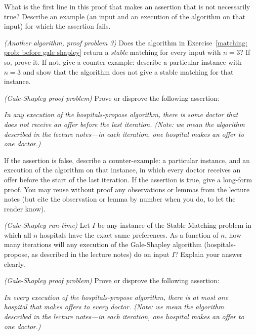\documentclass[11pt]{article}
\begin{document}
What is the first line in this proof that makes an assertion that is not necessarily true?
Describe an example (an input and an execution of the algorithm on that input)
for which the assertion fails.


\exercise\emph{(Another algorithm, proof problem 3)}
Does the algorithm in Exercise~\ref{matching: prob: before gale shapley}
return a \emph{stable} matching for every input with $n=3$?
If so, prove it.  If not, give a counter-example: describe a particular  instance with $n=3$
and show that the algorithm does not give a stable matching for that instance.


\exercise\label{matching: exercise: lonely doctor}\emph{(Gale-Shapley proof problem)}
Prove or disprove the following assertion:

\emph{In any execution of the hospitals-propose  algorithm,
  there is some doctor that does not receive an offer before the last iteration.
  (Note: we mean the algorithm described in the lecture notes---in each iteration, one hospital makes an offer to one doctor.)}

If the assertion is false, describe a counter-example:
a particular instance, and an execution of the algorithm on that instance,
in which every doctor receives an offer before the start of the last iteration.
If the assertion is true, give a long-form proof.
You may reuse without proof any observations or lemmas from the lecture notes
(but cite the observation or lemma by number when you do, to let the reader know).



\exercise\emph{(Gale-Shapley run-time)}
Let $I$ be any instance of the Stable Matching problem
in which all $n$ hospitals have the exact same preferences.
As a function of $n$,
how many iterations will any execution of the Gale-Shapley algorithm
(hospitals-propose, as described in the lecture notes)
do on input $I$?
Explain your answer clearly.


\exercise\label{matching: exercise: busy hospitals}\emph{(Gale-Shapley proof problem)}
Prove or disprove the following assertion:

\emph{
  In every execution of the hospitals-propose  algorithm,
  there is at most one hospital that makes offers to every doctor.
  (Note: we mean the algorithm described in the lecture notes---in each iteration, one hospital makes an offer to one doctor.)}
\end{document}
